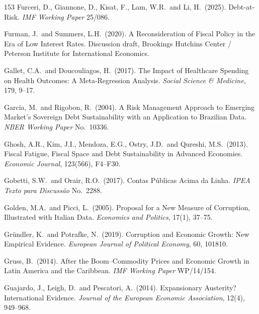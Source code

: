\documentclass[11pt,a4paper]{article}
\begin{document}
\begin{thebibliography}{153}
 Furceri, D., Giannone, D., Kisat, F., Lam, W.R.\ and Li, H.\ (2025). Debt-at-Risk. \textit{IMF Working Paper} 25/086.

 Furman, J.\ and Summers, L.H.\ (2020). A Reconsideration of Fiscal Policy in the Era of Low Interest Rates. Discussion draft, Brookings Hutchins Center / Peterson Institute for International Economics.

 Gallet, C.A.\ and Doucouliagos, H.\ (2017). The Impact of Healthcare Spending on Health Outcomes: A Meta-Regression Analysis. \textit{Social Science \& Medicine}, 179, 9--17.

 Garcia, M.\ and Rigobon, R.\ (2004). A Risk Management Approach to Emerging Market's Sovereign Debt Sustainability with an Application to Brazilian Data. \textit{NBER Working Paper} No.\ 10336.

 Ghosh, A.R., Kim, J.I., Mendoza, E.G., Ostry, J.D.\ and Qureshi, M.S.\ (2013). Fiscal Fatigue, Fiscal Space and Debt Sustainability in Advanced Economies. \textit{Economic Journal}, 123(566), F4--F30.

 Gobetti, S.W.\ and Orair, R.O.\ (2017). Contas P\'ublicas Acima da Linha. \textit{IPEA Texto para Discuss\~ao} No.\ 2288.

 Golden, M.A.\ and Picci, L.\ (2005). Proposal for a New Measure of Corruption, Illustrated with Italian Data. \textit{Economics and Politics}, 17(1), 37--75.

 Gr\"undler, K.\ and Potrafke, N.\ (2019). Corruption and Economic Growth: New Empirical Evidence. \textit{European Journal of Political Economy}, 60, 101810.

 Gruss, B.\ (2014). After the Boom--Commodity Prices and Economic Growth in Latin America and the Caribbean. \textit{IMF Working Paper} WP/14/154.

 Guajardo, J., Leigh, D.\ and Pescatori, A.\ (2014). Expansionary Austerity? International Evidence. \textit{Journal of the European Economic Association}, 12(4), 949--968.


\end{thebibliography}
\end{document}
